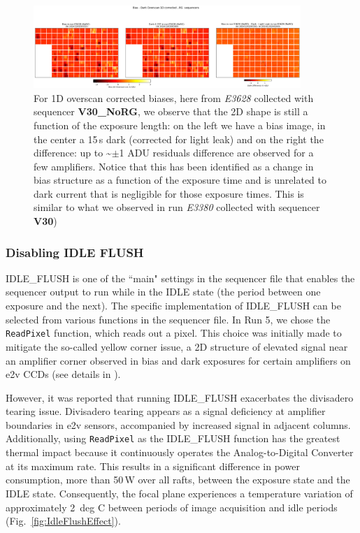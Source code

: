 \begin{figure}[ht]
\begin{centering}
\includegraphics[width=0.9\textwidth]{figures/1D_raw_NoRG_E3628_Bias-Dark_2024120200302_2024120200260.png}
\end{centering}
\caption{For 1D overscan corrected biases, here from {\it E3628} collected with sequencer {\bf V30\_NoRG}, we observe that the 2D shape is still a function of the exposure length: on the left we have a bias image, in the center a 15\,s dark (corrected for light leak) and on the right the difference: up to \textasciitilde$\pm$1 ADU residuals difference are observed for a few amplifiers. Notice that this has been identified as a change in bias structure as a function of the exposure time and is unrelated to dark current that is negligible for those exposure times. This is similar to what we observed in run {\it E3380} collected  with sequencer {\bf V30}) }\label{fig:BiasVSDark}
\end{figure}

\clearpage

\subsubsection{Disabling IDLE FLUSH}\label{section:disablingIDLEFLUSH}

IDLE\_FLUSH is one of the ``main" settings in the sequencer file that enables the sequencer output to run while in the IDLE state (the period between one exposure and the next). The specific implementation of IDLE\_FLUSH can be selected from various functions in the sequencer file. In Run 5, we chose the \texttt{ReadPixel} function, which reads out a pixel. This choice was initially made to mitigate the so-called yellow corner issue, a 2D structure of elevated signal near an amplifier corner observed in bias and dark exposures for certain amplifiers on e2v CCDs (see details in \citet{2024SPIE13103E..0WU}).

However, it was reported that running IDLE\_FLUSH exacerbates the divisadero tearing issue. Divisadero tearing appears as a signal deficiency at amplifier boundaries in e2v sensors, accompanied by increased signal in adjacent columns. Additionally, using \texttt{ReadPixel} as the IDLE\_FLUSH function has the greatest thermal impact because it continuously operates the Analog-to-Digital Converter at its maximum rate. This results in a significant difference in power consumption, more than 50\,W over all rafts, between the exposure state and the IDLE state. Consequently, the focal plane experiences a temperature variation of approximately 2~deg C between periods of image acquisition and idle periods (Fig.~\ref{fig:IdleFlushEffect}).

